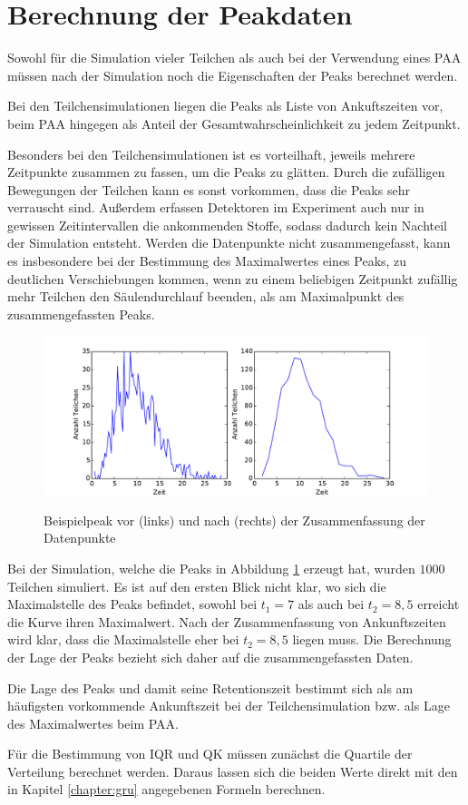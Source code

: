\section{Berechnung der Peakdaten}
Sowohl für die Simulation vieler Teilchen als auch bei der Verwendung eines PAA müssen nach der Simulation noch die Eigenschaften der Peaks berechnet werden. 

Bei den Teilchensimulationen liegen die Peaks als Liste von Ankuftszeiten vor, beim PAA hingegen als Anteil der Gesamtwahrscheinlichkeit zu jedem Zeitpunkt. 

Besonders bei den Teilchensimulationen ist es vorteilhaft, jeweils mehrere Zeitpunkte zusammen zu fassen, um die Peaks zu glätten. Durch die zufälligen Bewegungen der Teilchen kann es sonst vorkommen, dass die Peaks sehr verrauscht sind. Außerdem erfassen Detektoren im Experiment auch nur in gewissen Zeitintervallen die ankommenden Stoffe, sodass dadurch kein Nachteil der Simulation entsteht.
Werden die Datenpunkte nicht zusammengefasst, kann es insbesondere bei der Bestimmung des Maximalwertes eines Peaks, zu deutlichen Verschiebungen kommen, wenn zu einem beliebigen Zeitpunkt zufällig mehr Teilchen den Säulendurchlauf beenden, als am Maximalpunkt des zusammengefassten Peaks.

\begin{figure}
 \centering
  \includegraphics[width = \textwidth]{bilder/zeiten_zusammenfassen}\\
  \caption[Zeiten zusammenfassen]{Beispielpeak vor (links) und nach (rechts) der Zusammenfassung der Datenpunkte}
  \label{zeiten_zusammenfassen}
\end{figure}

Bei der Simulation, welche die Peaks in Abbildung \ref{zeiten_zusammenfassen} erzeugt hat, wurden $1000$ Teilchen simuliert. Es ist auf den ersten Blick nicht klar, wo sich die Maximalstelle des Peaks befindet, sowohl bei $t_1 = 7$ als auch bei $ t_2 = 8,5$ erreicht die Kurve ihren Maximalwert. Nach der Zusammenfassung von Ankunftszeiten wird klar, dass die Maximalstelle eher bei $t_2 = 8,5$ liegen muss. Die Berechnung der Lage der Peaks bezieht sich daher auf die zusammengefassten Daten.

Die Lage des Peaks und damit seine Retentionszeit bestimmt sich als am häufigsten vorkommende Ankunftszeit bei der Teilchensimulation bzw. als Lage des Maximalwertes beim PAA.

Für die Bestimmung von IQR und QK müssen zunächst die Quartile der Verteilung berechnet werden. Daraus lassen sich die beiden Werte direkt mit den in Kapitel \ref{chapter:gru} angegebenen Formeln berechnen. 
